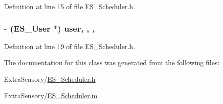Definition at line 15 of file E\+S\+\_\+\+Scheduler.\+h.

\hypertarget{interface_e_s___scheduler_ab0c6af0137b6225db72428f83f4cf2e0}{
\subsubsection[{user}]{\setlength{\rightskip}{0pt plus 5cm}-\/ ({\bf E\+S\+\_\+\+User} $\ast$) user\hspace{0.3cm}{\ttfamily [read]}, {\ttfamily [write]}, {\ttfamily [nonatomic]}, {\ttfamily [weak]}}}\label{interface_e_s___scheduler_ab0c6af0137b6225db72428f83f4cf2e0}


Definition at line 19 of file E\+S\+\_\+\+Scheduler.\+h.



The documentation for this class was generated from the following files\+:\begin{DoxyCompactItemize}
\item 
Extra\+Sensory/\hyperlink{_e_s___scheduler_8h}{E\+S\+\_\+\+Scheduler.\+h}\item 
Extra\+Sensory/\hyperlink{_e_s___scheduler_8m}{E\+S\+\_\+\+Scheduler.\+m}\end{DoxyCompactItemize}
